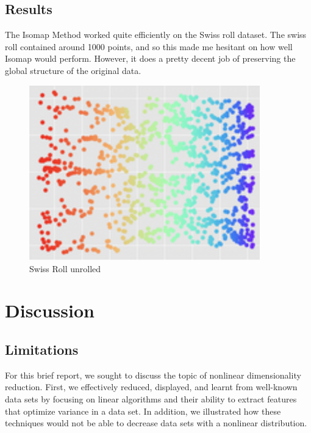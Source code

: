 \documentclass[11pt]{article}
\begin{document}
\hspace{5mm}

\subsection{Results}


\hspace{5mm}The Isomap Method worked quite efficiently on the Swiss roll dataset. The swiss roll contained around 1000 points, and so this made me hesitant on how well Isomap would perform. However, it does a pretty decent job of preserving the global structure of the original data.

\begin{figure}[h!]
    \centering
    \includegraphics[width=100mm]{swissrollunrolled.png}
    \caption{Swiss Roll unrolled}
    \label{fig:swissunrolled}
\end{figure}


\newpage

\section{Discussion} \label{sec:discussion}

\hspace{5mm}


\subsection{Limitations}
\hspace{5mm}For this brief report, we sought to discuss the topic of nonlinear dimensionality reduction. First, we effectively reduced, displayed, and learnt from well-known data sets by focusing on linear algorithms and their ability to extract features that optimize variance in a data set. In addition, we illustrated how these techniques would not be able to decrease data sets with a nonlinear distribution.
\end{document}

